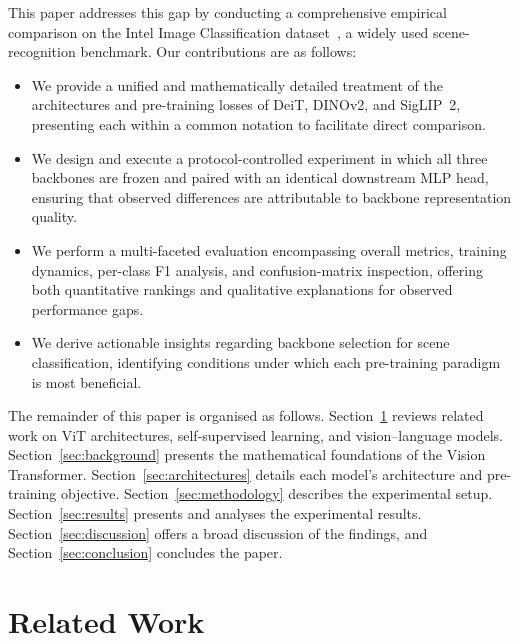 \documentclass[journal]{IEEEtran}
\begin{document}
This paper addresses this gap by conducting a comprehensive empirical comparison on the Intel
Image Classification dataset~\cite{intelDataset}, a widely used scene-recognition benchmark.
Our contributions are as follows:

\begin{itemize}
    \item We provide a unified and mathematically detailed treatment of the architectures and
    pre-training losses of DeiT, DINOv2, and SigLIP~2, presenting each within a common
    notation to facilitate direct comparison.

    \item We design and execute a protocol-controlled experiment in which all three backbones
    are frozen and paired with an identical downstream MLP head, ensuring that observed
    differences are attributable to backbone representation quality.

    \item We perform a multi-faceted evaluation encompassing overall metrics, training
    dynamics, per-class F1 analysis, and confusion-matrix inspection, offering both
    quantitative rankings and qualitative explanations for observed performance gaps.

    \item We derive actionable insights regarding backbone selection for scene classification,
    identifying conditions under which each pre-training paradigm is most beneficial.
\end{itemize}

The remainder of this paper is organised as follows. Section~\ref{sec:related} reviews related
work on ViT architectures, self-supervised learning, and vision–language models.
Section~\ref{sec:background} presents the mathematical foundations of the Vision Transformer.
Section~\ref{sec:architectures} details each model's architecture and pre-training objective.
Section~\ref{sec:methodology} describes the experimental setup. Section~\ref{sec:results}
presents and analyses the experimental results. Section~\ref{sec:discussion} offers a broad
discussion of the findings, and Section~\ref{sec:conclusion} concludes the paper.

\section{Related Work}
\label{sec:related}
\end{document}
